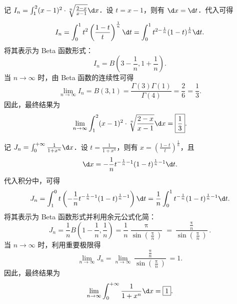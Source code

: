 \begin{solution}
    记 $I_n = \int_{1}^{2} (x-1)^2 \cdot \sqrt[n]{\frac{2-x}{x-1}} \d x$．设 $t = x-1$，则有 $\d x = \d t$．代入可得
    \begin{equation}\label{eq:sol9-1}
        I_n = \int_{0}^{1} t^2 \left(\frac{1-t}{t}\right)^{\frac{1}{n}} \d t = \int_{0}^{1} t^{2-\frac{1}{n}} (1-t)^{\frac{1}{n}} \d t.
    \end{equation}
    将其表示为 Beta 函数形式：
    \begin{equation}\label{eq:sol9-2}
        I_n = B\left(3 - \frac{1}{n}, 1 + \frac{1}{n}\right).
    \end{equation}
    当 $n \to \infty$ 时，由 Beta 函数的连续性可得
    \begin{equation}\label{eq:sol9-3}
        \lim_{n \to \infty} I_n = B(3, 1) = \frac{\Gamma(3) \Gamma(1)}{\Gamma(4)} = \frac{2}{6} = \frac{1}{3}.
    \end{equation}
    因此，最终结果为
    \begin{equation}
        \lim_{n \to \infty} \int_{1}^{2} (x-1)^2 \cdot \sqrt[n]{\frac{2-x}{x-1}} \d x = \boxed{\frac{1}{3}}.
    \end{equation}


    记 $J_n = \int_{0}^{+\infty} \frac{1}{1+x^n} \d x$．设 $t = \frac{1}{1+x^n}$，则有 $x = \left(\frac{1-t}{t}\right)^{\frac{1}{n}}$，且
    \begin{equation}\label{eq:sol10-1}
        \d x = -\frac{1}{n} t^{-\frac{1}{n}-1} (1-t)^{\frac{1}{n}-1} \d t.
    \end{equation}
    代入积分中，可得
    \begin{equation}\label{eq:sol10-2}
        J_n = \int_{1}^{0} t \left( -\frac{1}{n} t^{-\frac{1}{n}-1} (1-t)^{\frac{1}{n}-1} \right) \d t = \frac{1}{n} \int_{0}^{1} t^{-\frac{1}{n}} (1-t)^{\frac{1}{n}-1} \d t.
    \end{equation}
    将其表示为 Beta 函数形式并利用余元公式化简：
    \begin{equation}\label{eq:sol10-3}
        J_n = \frac{1}{n} B\left(1 - \frac{1}{n}, \frac{1}{n}\right) = \frac{1}{n} \frac{\uppi}{\sin\left(\frac{\uppi}{n}\right)} = \frac{\frac{\uppi}{n}}{\sin\left(\frac{\uppi}{n}\right)}.
    \end{equation}
    当 $n \to \infty$ 时，利用重要极限得
    \begin{equation}\label{eq:sol10-4}
        \lim_{n \to \infty} J_n = \lim_{n \to \infty} \frac{\frac{\uppi}{n}}{\sin\left(\frac{\uppi}{n}\right)} = 1.
    \end{equation}
    因此，最终结果为
    \begin{equation}
        \lim_{n \to \infty} \int_{0}^{+\infty} \frac{1}{1+x^n} \d x = \boxed{1}.
    \end{equation}
\end{solution}

